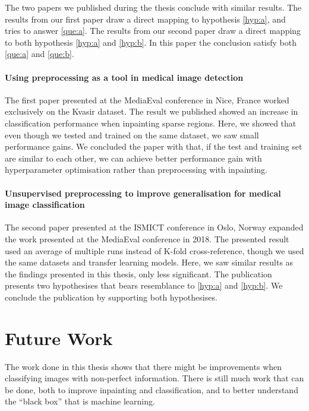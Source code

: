 The two papers we published during the thesis conclude with similar results. The results from our first paper draw a direct mapping to hypothesis \ref{hyp:a}, and tries to answer \ref{que:a}. The results from our second paper draw a direct mapping to both hypothesis \ref{hyp:a} and \ref{hyp:b}. In this paper the conclusion satisfy both \ref{que:a} and \ref{que:b}. 


\paragraph{Using preprocessing as a tool in medical image detection~\cite{26254}}
The first paper presented at the MediaEval conference in Nice, France worked exclusively on the Kvasir dataset. The result we published showed an increase in classification performance when inpainting sparse regions. 
Here, we showed that even though we tested and trained on the same dataset, we saw small performance gains. We concluded the paper with that, if the test and training set are similar to each other, we can achieve better performance gain with hyperparameter optimisation rather than preprocessing with inpainting. 

\paragraph{Unsupervised preprocessing to improve generalisation for medical image classification~\cite{Mathias2019IEEpaper}}
The second paper presented at the ISMICT conference in Oslo, Norway expanded the work presented at the MediaEval conference in 2018.
The presented result used an average of multiple runs instead of K-fold cross-reference, though we used the same datasets and transfer learning models.
Here, we saw similar results as the findings presented in this thesis, only less significant. The publication presents two hypothesises that bears resemblance to \ref{hyp:a} and \ref{hyp:b}. We conclude the publication by supporting both hypothesises.




\section{Future Work}
The work done in this thesis shows that there might be improvements when classifying images with non-perfect information. There is still much work that can be done, both to improve inpainting and classification, and to better understand the ``black box'' that is machine learning. 

